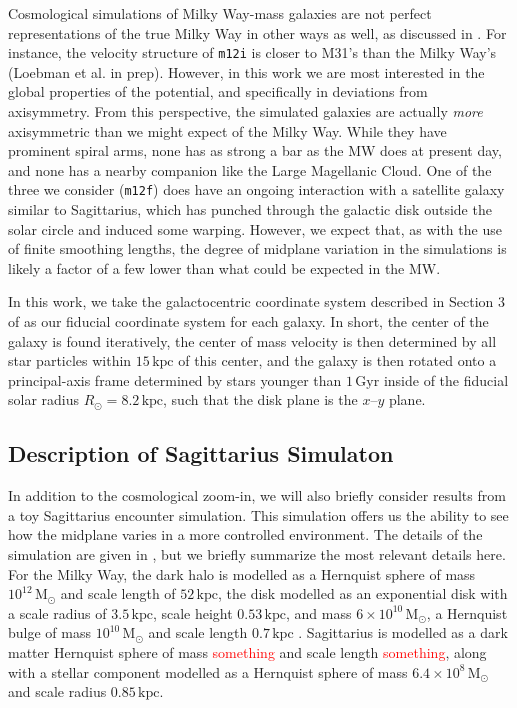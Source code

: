 \documentclass[twocolumn]{aastex62}
\newcommand{\Gus}[1]{\textcolor{red}{#1}}
\newcommand{\Msun}{\ensuremath{\text{M}_\odot}}
\newcommand{\kpc}{\text{kpc}}
\newcommand{\Gyr}{\text{Gyr}}
\newcommand{\mi}{\texttt{m12i}}
\newcommand{\mf}{\texttt{m12f}}
\begin{document}
Cosmological simulations of Milky Way-mass galaxies are not perfect
representations of the true Milky Way in other ways as well, as discussed in
\citet{2018arXiv180610564S}. For instance, the velocity structure of \mi{} is
closer to M31's than the Milky Way's (Loebman et al. in prep). However, in
this work we are most interested in the global properties of the potential,
and specifically in deviations from axisymmetry. From this perspective, the
simulated galaxies are actually \emph{more} axisymmetric than we might expect
of the Milky Way. While they have prominent spiral arms, none has as strong a
bar as the MW does at present day, and none has a nearby companion like the
Large Magellanic Cloud. One of the three we consider (\mf) does have an
ongoing interaction with a satellite galaxy similar to Sagittarius, which has
punched through the galactic disk outside the solar circle and induced some
warping. However, we expect that, as with the use of finite smoothing lengths,
the degree of midplane variation in the simulations is likely a factor of a
few lower than what could be expected in the MW.

In this work, we take the galactocentric coordinate system described in
Section 3 of \citet{2018arXiv180610564S} as our fiducial coordinate system for
each galaxy. In short, the center of the galaxy is found iteratively, the
center of mass velocity is then determined by all star particles within
$15\,\kpc$ of this center, and the galaxy is then rotated onto a
principal-axis frame determined by stars younger than $1\,\Gyr$ inside of the
fiducial solar radius $R_{\odot} = 8.2\,\kpc$, such that the disk plane is the
$x$--$y$ plane.

\subsection{Description of Sagittarius Simulaton} \label{ssec:sag_sim}
In addition to the cosmological zoom-in, we will also briefly consider results
from a toy Sagittarius encounter simulation. This simulation offers us the
ability to see how the midplane varies in a more controlled environment. The
details of the simulation are given in \citet{2018MNRAS.481..286L}, but we
briefly summarize the most relevant details here. For the Milky Way, the dark
halo is modelled as a Hernquist sphere of mass $10^{12}\,\Msun$ and scale
length of $52\,\kpc$, the disk modelled as an exponential disk with a scale
radius of $3.5\,\kpc$, scale height $0.53\,\kpc$, and mass
$6\times10^{10}\,\Msun$, a Hernquist bulge of mass $10^{10}\,\Msun$ and scale
length $0.7\,\kpc$ \citep{1990ApJ...356..359H}. Sagittarius is modelled as a
dark matter Hernquist sphere of mass \Gus{something} and scale length
\Gus{something}, along with a stellar component modelled as a Hernquist sphere
of mass $6.4\times10^8\,\Msun$ and scale radius $0.85\,\kpc$.
\end{document}
